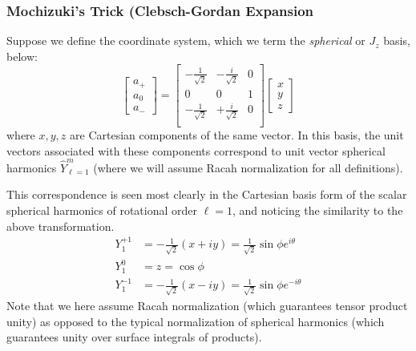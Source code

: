 \documentclass[10pt,a4paper]{article}
\begin{document}
\subsubsection{Mochizuki's Trick (Clebsch-Gordan Expansion}
Suppose we define the coordinate system, which we term the \textit{spherical} or $J_z$ basis, below:
$$
\begin{bmatrix}
a_+ \\
a_0 \\
a_-
\end{bmatrix}=\begin{bmatrix}
-\frac{1}{\sqrt{2}} & -\frac{i}{\sqrt{2}} & 0\\
 0 & 0 & 1\\
-\frac{1}{\sqrt{2}} & +\frac{i}{\sqrt{2}} & 0\\
\end{bmatrix}\begin{bmatrix}
x \\
y \\
z
\end{bmatrix}
$$
where $x,y,z$ are Cartesian components of the same vector. In this basis, the unit vectors associated with these components correspond to unit vector spherical harmonics $\hat{Y}_{\ell=1}^m$ (where we will assume Racah normalization for all definitions).

This correspondence is seen most clearly in the Cartesian basis form of the scalar spherical harmonics of rotational order $\ell=1$, and noticing the similarity to the above transformation.
\begin{align*}
Y_1^{+1} &= -\frac{1}{\sqrt{2}}(x+iy)=\frac{1}{\sqrt{2}}\sin \phi e^{i\theta}\\
Y_1^{0}\ \ &= z = \cos \phi\\
Y_1^{-1} &= -\frac{1}{\sqrt{2}}(x-iy)=\frac{1}{\sqrt{2}}\sin \phi e^{-i\theta}
\end{align*}
Note that we here assume Racah normalization (which guarantees tensor product unity) as opposed to the typical normalization of spherical harmonics (which guarantees unity over surface integrals of products).
\end{document}
